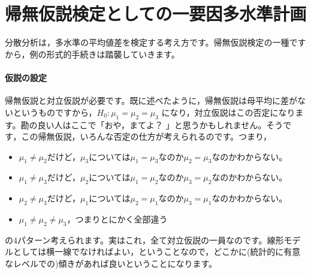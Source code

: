 \documentclass{ltjsarticle}
\begin{document}



\section{帰無仮説検定としての一要因多水準計画}
分散分析は，多水準の平均値差を検定する考え方です。帰無仮説検定の一種ですから，例の形式的手続きは踏襲していきます。
\paragraph{仮説の設定}帰無仮説と対立仮説が必要です。既に述べたように，帰無仮説は母平均に差がないというものですから，$H_0 : \mu_1 = \mu_2 = \mu_3$ になり，対立仮説はこの否定になります。勘の良い人はここで「おや，まてよ？ 」と思うかもしれません。そうです，この帰無仮説，いろんな否定の仕方が考えられるのです。つまり，
\begin{itemize}
    \item $\mu_1 \neq \mu_2$だけど，$\mu_3$については$\mu_1=\mu_3$なのか$\mu_2=\mu_3$なのかわからない。
    \item $\mu_1 \neq \mu_3$だけど，$\mu_2$については$\mu_1=\mu_2$なのか$\mu_3=\mu_2$なのかわからない。
    \item $\mu_2 \neq \mu_3$だけど，$\mu_1$については$\mu_2=\mu_1$なのか$\mu_3=\mu_1$なのかわからない。
    \item $\mu_1 \neq \mu_2 \neq \mu_3$，つまりとにかく全部違う
\end{itemize}
の4パターン考えられます。実はこれ，全て対立仮説の一員なのです。線形モデルとしては横一線でなければよい，ということなので，どこかに(統計的に有意なレベルでの)傾きがあれば良いということになります。
\end{document}
